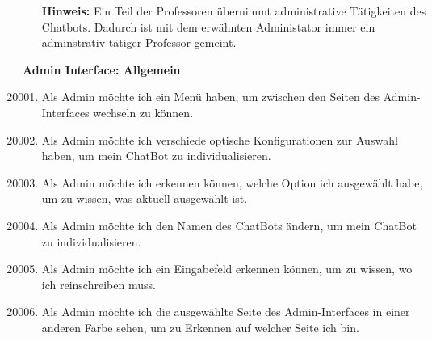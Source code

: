 \begin{enumerate}[leftmargin=*,labelindent=40pt,label=u\arabic*.]
    \item[\textbf{Hinweis:}] Ein Teil der Professoren übernimmt administrative Tätigkeiten des Chatbots. Dadurch ist mit dem erwähnten Administator immer ein adminstrativ tätiger Professor gemeint.
\end{enumerate}
\newpage
\textbf{Admin Interface: Allgemein}
\begin{enumerate}[leftmargin=*,labelindent=40pt,label=u\arabic*.]
    \setcounter{enumi}{20000}
    \item Als Admin möchte ich ein Menü haben, um zwischen den Seiten des Admin-Interfaces wechseln zu können.
    \item Als Admin möchte ich verschiede optische Konfigurationen zur Auswahl haben, um mein ChatBot zu individualisieren.
    \item Als Admin möchte ich erkennen können, welche Option ich ausgewählt habe, um zu wissen, was aktuell ausgewählt ist.
    \item Als Admin möchte ich den Namen des ChatBots ändern, um mein ChatBot zu individualisieren.
    \item Als Admin möchte ich ein Eingabefeld erkennen können, um zu wissen, wo ich reinschreiben muss.
    \item Als Admin möchte ich die ausgewählte Seite des Admin-Interfaces in einer anderen Farbe sehen, um zu Erkennen auf welcher Seite ich bin.
\end{enumerate}

